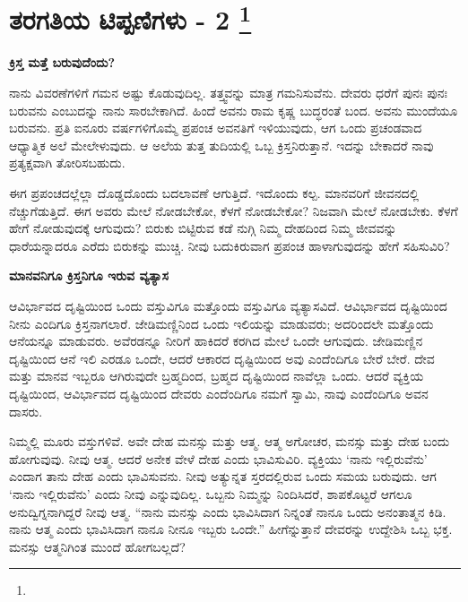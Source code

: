 
\vspace{-1cm}

\chapter[ತರಗತಿಯ ಟಿಪ್ಪಣಿಗಳು - 2 ]{ತರಗತಿಯ ಟಿಪ್ಪಣಿಗಳು - 2 \protect\footnote{}}

\begin{center}
\textbf{ಕ್ರಿಸ್ತ ಮತ್ತೆ ಬರುವುದೆಂದು?}
\end{center}

\vspace{-0.3cm}

ನಾನು ವಿವರಣೆಗಳಿಗೆ ಗಮನ ಅಷ್ಟು ಕೊಡುವುದಿಲ್ಲ. ತತ್ತ್ವವನ್ನು ಮಾತ್ರ ಗಮನಿಸುವೆನು. ದೇವರು ಧರೆಗೆ ಪುನಃ ಪುನಃ ಬರುವನು ಎಂಬುದನ್ನು ನಾನು ಸಾರಬೇಕಾಗಿದೆ. ಹಿಂದೆ ಅವನು ರಾಮ ಕೃಷ್ಣ ಬುದ್ಧರಂತೆ ಬಂದ. ಅವನು ಮುಂದೆಯೂ ಬರುವನು. ಪ್ರತಿ ಐನೂರು ವರ್ಷಗಳಿಗೊಮ್ಮೆ ಪ್ರಪಂಚ ಅವನತಿಗೆ ಇಳಿಯುವುದು, ಆಗ ಒಂದು ಪ್ರಚಂಡವಾದ ಆಧ್ಯಾತ್ಮಿಕ ಅಲೆ ಮೇಲೇಳುವುದು. ಆ ಅಲೆಯ ತುತ್ತ ತುದಿಯಲ್ಲಿ ಒಬ್ಬ ಕ್ರಿಸ್ತನಿರುತ್ತಾನೆ. ಇದನ್ನು ಬೇಕಾದರೆ ನಾವು ಪ್ರತ್ಯಕ್ಷವಾಗಿ ತೋರಿಸಬಹುದು.

ಈಗ ಪ್ರಪಂಚದಲ್ಲೆಲ್ಲಾ ದೊಡ್ಡದೊಂದು ಬದಲಾವಣೆ ಆಗುತ್ತಿದೆ. ಇದೊಂದು ಕಲ್ಪ. ಮಾನವರಿಗೆ ಜೀವನದಲ್ಲಿ ನೆಚ್ಚುಗೆಡುತ್ತಿದೆ. ಈಗ ಅವರು ಮೇಲೆ ನೋಡಬೇಕೋ, ಕೆಳಗೆ ನೋಡಬೇಕೋ? ನಿಜವಾಗಿ ಮೇಲೆ ನೋಡಬೇಕು. ಕೆಳಗೆ ಹೇಗೆ ನೋಡುವುದಕ್ಕೆ ಆಗುವುದು? ಬಿರುಕು ಬಿಟ್ಟಿರುವ ಕಡೆ ನುಗ್ಗಿ ನಿಮ್ಮ ದೇಹದಿಂದ ನಿಮ್ಮ ಜೀವವನ್ನು ಧಾರೆಯನ್ನಾದರೂ ಎರೆದು ಬಿರುಕನ್ನು ಮುಚ್ಚಿ. ನೀವು ಬದುಕಿರುವಾಗ ಪ್ರಪಂಚ ಹಾಳಾಗುವುದನ್ನು ಹೇಗೆ ಸಹಿಸುವಿರಿ?

\vspace{-0.3cm}

\begin{center}
\textbf{ಮಾನವನಿಗೂ ಕ್ರಿಸ್ತನಿಗೂ ಇರುವ ವ್ಯತ್ಯಾಸ}
\end{center}

\vspace{-0.3cm}

ಆವಿರ್ಭಾವದ ದೃಷ್ಟಿಯಿಂದ ಒಂದು ವಸ್ತುವಿಗೂ ಮತ್ತೊಂದು ವಸ್ತುವಿಗೂ ವ್ಯತ್ಯಾಸವಿದೆ. ಆವಿರ್ಭಾವದ ದೃಷ್ಟಿಯಿಂದ ನೀನು ಎಂದಿಗೂ ಕ್ರಿಸ್ತನಾಗಲಾರೆ. ಜೇಡಿಮಣ್ಣಿನಿಂದ ಒಂದು ಇಲಿಯನ್ನು ಮಾಡುವರು; ಅದರಿಂದಲೇ ಮತ್ತೊಂದು ಆನೆಯನ್ನೂ ಮಾಡುವರು. ಅವೆರಡನ್ನೂ ನೀರಿಗೆ ಹಾಕಿದರೆ ಕರಗಿದ ಮೇಲೆ ಒಂದೇ ಆಗುವುದು. ಜೇಡಿಮಣ್ಣಿನ ದೃಷ್ಟಿಯಿಂದ ಆನೆ ಇಲಿ ಎರಡೂ ಒಂದೇ, ಆದರೆ ಆಕಾರದ ದೃಷ್ಟಿಯಿಂದ ಅವು ಎಂದೆಂದಿಗೂ ಬೇರೆ ಬೇರೆ. ದೇವ ಮತ್ತು ಮಾನವ ಇಬ್ಬರೂ ಆಗಿರುವುದೇ ಬ್ರಹ್ಮದಿಂದ, ಬ್ರಹ್ಮದ ದೃಷ್ಟಿಯಿಂದ ನಾವೆಲ್ಲಾ ಒಂದು. ಆದರೆ ವ್ಯಕ್ತಿಯ ದೃಷ್ಟಿಯಿಂದ, ಆವಿರ್ಭಾವದ ದೃಷ್ಟಿಯಿಂದ ದೇವರು ಎಂದೆಂದಿಗೂ ನಮಗೆ ಸ್ವಾಮಿ, ನಾವು ಎಂದೆಂದಿಗೂ ಅವನ ದಾಸರು.

ನಿಮ್ಮಲ್ಲಿ ಮೂರು ವಸ್ತುಗಳಿವೆ. ಅವೇ ದೇಹ ಮನಸ್ಸು ಮತ್ತು ಆತ್ಮ. ಆತ್ಮ ಅಗೋಚರ, ಮನಸ್ಸು ಮತ್ತು ದೇಹ ಬಂದು ಹೋಗುವುವು. ನೀವು ಆತ್ಮ. ಆದರೆ ಅನೇಕ ವೇಳೆ ದೇಹ ಎಂದು ಭಾವಿಸುವಿರಿ. ವ್ಯಕ್ತಿಯು ‘ನಾನು ಇಲ್ಲಿರುವೆನು’ ಎಂದಾಗ ತಾನು ದೇಹ ಎಂದು ಭಾವಿಸುವನು. ನೀವು ಅತ್ಯುನ್ನತ ಸ್ತರದಲ್ಲಿರುವ ಒಂದು ಸಮಯ ಬರುವುದು. ಆಗ ‘ನಾನು ಇಲ್ಲಿರುವೆನು’ ಎಂದು ನೀವು ಎನ್ನುವುದಿಲ್ಲ. ಒಬ್ಬನು ನಿಮ್ಮನ್ನು ನಿಂದಿಸಿದರೆ, ಶಾಪಕೊಟ್ಟರೆ ಆಗಲೂ ಅನುದ್ವಿಗ್ನನಾಗಿದ್ದರೆ ನೀವು ಆತ್ಮ. “ನಾನು ಮನಸ್ಸು ಎಂದು ಭಾವಿಸಿದಾಗ ನಿನ್ನಂತೆ ನಾನೂ ಒಂದು ಅನಂತಾತ್ಮನ ಕಿಡಿ. ನಾನು ಆತ್ಮ ಎಂದು ಭಾವಿಸಿದಾಗ ನಾನೂ ನೀನೂ ಇಬ್ಬರು ಒಂದೇ.” ಹೀಗೆನ್ನುತ್ತಾನೆ ದೇವರನ್ನು ಉದ್ದೇಶಿಸಿ ಒಬ್ಬ ಭಕ್ತ. ಮನಸ್ಸು ಆತ್ಮನಿಗಿಂತ ಮುಂದೆ ಹೋಗಬಲ್ಲದೆ?

